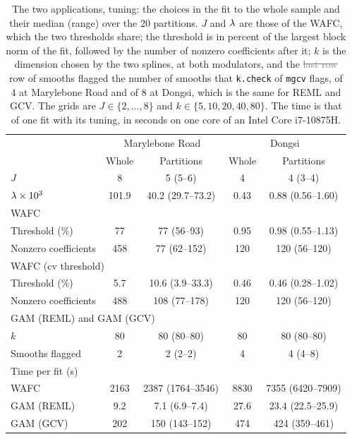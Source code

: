 \begin{table}[tp]
\color{colR1}
\caption{The two applications, tuning: the choices in the fit to the whole
sample and their median (range) over the 20 partitions. $J$ and $\lambda$ are
those of the WAFC, which the two thresholds share; the threshold is in
percent of the largest block norm of the fit, followed by the number of
nonzero coefficients after it; $k$ is the dimension chosen by the two
splines, at both modulators, and the \textcolor{gray}{\sout{last row}} row
of smooths flagged the number of smooths that
\texttt{k.check} of \texttt{mgcv} flags, of 4 at Marylebone Road and of 8 at
Dongsi, which is the same for REML and GCV. The grids are
$J \in \{2,\dots,8\}$ and $k \in \{5,10,20,40,80\}$. The time is that of
one fit with its tuning, in seconds on one core of an Intel Core i7-10875H.}
\label{tab:app-tuning}
\centering
\small
\begin{tabular}{lcccc}
\hline
 & \multicolumn{2}{c}{Marylebone Road} & \multicolumn{2}{c}{Dongsi} \\
 & Whole & Partitions & Whole & Partitions \\
\hline
$J$ & 8 & 5 (5--6) & 4 & 4 (3--4) \\
$\lambda \times 10^{3}$ & 101.9 & 40.2 (29.7--73.2) & 0.43 & 0.88 (0.56--1.60) \\
\multicolumn{5}{l}{WAFC} \\
\quad Threshold (\%) & 77 & 77 (56--93) & 0.95 & 0.98 (0.55--1.13) \\
\quad Nonzero coefficients & 458 & 77 (62--152) & 120 & 120 (56--120) \\
\multicolumn{5}{l}{WAFC (cv threshold)} \\
\quad Threshold (\%) & 5.7 & 10.6 (3.9--33.3) & 0.46 & 0.46 (0.28--1.02) \\
\quad Nonzero coefficients & 488 & 108 (77--178) & 120 & 120 (56--120) \\
\multicolumn{5}{l}{GAM (REML) and GAM (GCV)} \\
\quad $k$ & 80 & 80 (80--80) & 80 & 80 (80--80) \\
\quad Smooths flagged & 2 & 2 (2--2) & 4 & 4 (4--8) \\
\multicolumn{5}{l}{Time per fit (s)} \\
\quad WAFC & 2163 & 2387 (1764--3546) & 8830 & 7355 (6420--7909) \\
\quad GAM (REML) & 9.2 & 7.1 (6.9--7.4) & 27.6 & 23.4 (22.5--25.9) \\
\quad GAM (GCV) & 202 & 150 (143--152) & 474 & 424 (359--461) \\
\hline
\end{tabular}
\end{table}
